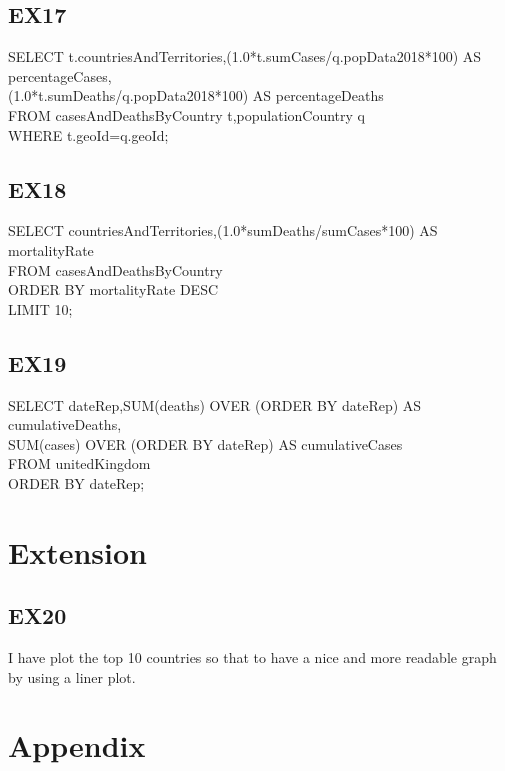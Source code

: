 \documentclass{article}
\begin{document}
\subsection{EX17}
SELECT t.countriesAndTerritories,(1.0*t.sumCases/q.popData2018*100) AS percentageCases,\\ (1.0*t.sumDeaths/q.popData2018*100) AS percentageDeaths\\
FROM casesAndDeathsByCountry t,populationCountry q\\
WHERE t.geoId=q.geoId;
\subsection{EX18}
SELECT countriesAndTerritories,(1.0*sumDeaths/sumCases*100) AS mortalityRate\\
FROM casesAndDeathsByCountry\\
ORDER BY mortalityRate DESC\\
LIMIT 10;
\subsection{EX19}
SELECT dateRep,SUM(deaths) OVER (ORDER BY dateRep) AS cumulativeDeaths,\\SUM(cases) OVER (ORDER BY dateRep) AS cumulativeCases\\
FROM unitedKingdom\\
ORDER BY dateRep;
\section{Extension}
\subsection{EX20}
I have plot the top 10 countries so that to have a nice and more readable graph by using a liner plot.

\newpage
\section{Appendix}
\end{document}
